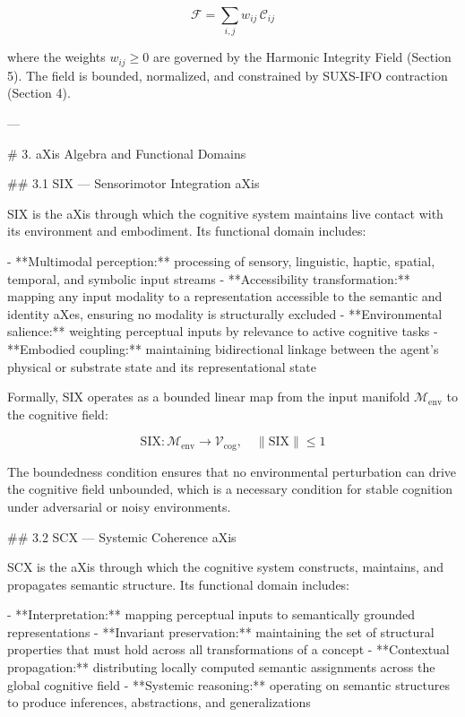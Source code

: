 \[
\mathcal{F} = \sum_{i,j} w_{ij}\, \mathcal{C}_{ij}
\]

where the weights \(w_{ij} \geq 0\) are governed by the Harmonic Integrity Field
(Section 5). The field is bounded, normalized, and constrained by SUXS-IFO contraction
(Section 4).

---

# 3. aXis Algebra and Functional Domains

## 3.1 SIX — Sensorimotor Integration aXis

SIX is the aXis through which the cognitive system maintains live contact with
its environment and embodiment. Its functional domain includes:

- **Multimodal perception:** processing of sensory, linguistic, haptic, spatial,
  temporal, and symbolic input streams
- **Accessibility transformation:** mapping any input modality to a representation
  accessible to the semantic and identity aXes, ensuring no modality is
  structurally excluded
- **Environmental salience:** weighting perceptual inputs by relevance to active
  cognitive tasks
- **Embodied coupling:** maintaining bidirectional linkage between the agent's
  physical or substrate state and its representational state

Formally, SIX operates as a bounded linear map from the input manifold
\(\mathcal{M}_{\text{env}}\) to the cognitive field:

\[
\mathrm{SIX}: \mathcal{M}_{\text{env}} \rightarrow \mathcal{V}_{\text{cog}}, \quad
\|\mathrm{SIX}\| \leq 1
\]

The boundedness condition ensures that no environmental perturbation can drive the
cognitive field unbounded, which is a necessary condition for stable cognition under
adversarial or noisy environments.

## 3.2 SCX — Systemic Coherence aXis

SCX is the aXis through which the cognitive system constructs, maintains, and
propagates semantic structure. Its functional domain includes:

- **Interpretation:** mapping perceptual inputs to semantically grounded
  representations
- **Invariant preservation:** maintaining the set of structural properties that
  must hold across all transformations of a concept
- **Contextual propagation:** distributing locally computed semantic assignments
  across the global cognitive field
- **Systemic reasoning:** operating on semantic structures to produce inferences,
  abstractions, and generalizations

